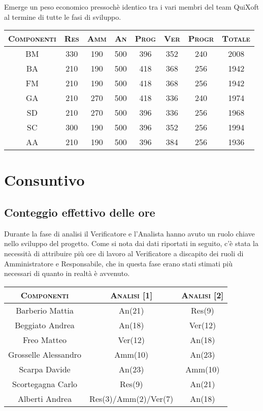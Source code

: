\documentclass[11pt,a4paper]{article}
\begin{document}
Emerge un peso economico pressochè identico tra i vari membri del team QuiXoft al termine di tutte le fasi di sviluppo.
\begin{center}
\begin{tabular}{|c||c|c|c|c|c|c||c|}
\hline
\textsc{Componenti} & \textsc{Res} & \textsc{Amm} & \textsc{An} & \textsc{Prog} & \textsc{Ver} & \textsc{Progr} & \textsc{Totale}\\
\hline \hline
BM & 330 & 190 & 500 & 396 & 352 & 240 & 2008 \\ \hline
BA & 210 & 190 & 500 & 418 & 368 & 256 & 1942 \\ \hline
FM & 210 & 190 & 500 & 418 & 368 & 256 & 1942 \\ \hline
GA & 210 & 270 & 500 & 418 & 336 & 240 & 1974 \\ \hline
SD & 210 & 270 & 500 & 396 & 336 & 256 & 1968 \\ \hline
SC & 300 & 190 & 500 & 396 & 352 & 256 & 1994 \\ \hline
AA & 210 & 190 & 500 & 396 & 384 & 256 & 1936 \\ \hline
\end{tabular}
\end{center}
\newpage

\section{Consuntivo}
\subsection{Conteggio effettivo delle ore}
Durante la fase di analisi il Verificatore e l'Analista hanno avuto un ruolo chiave nello sviluppo del progetto.
Come si nota dai dati riportati in seguito, c'è stata la necessità di attribuire più ore di lavoro al Verificatore a discapito dei ruoli di Amministratore e Responsabile, che in questa fase erano stati stimati più necessari di quanto in realtà è avvenuto.
\\
\begin{center}
\begin{tabular}{|c||c|c|}
\hline
\textsc{Componenti} & \textsc{Analisi [1]} & \textsc{Analisi [2]} \\ \hline \hline
Barberio Mattia & An(21) & Res(9) \\ \hline
Beggiato Andrea & An(18) & Ver(12) \\ \hline
Freo Matteo & Ver(12) & An(18) \\ \hline
Grosselle Alessandro & Amm(10) & An(23) \\ \hline
Scarpa Davide & An(23) & Amm(10) \\ \hline
Scortegagna Carlo & Res(9) & An(21) \\ \hline
Alberti Andrea & Res(3)/Amm(2)/Ver(7) & An(18) \\ \hline
\end{tabular}
\end{center}
\bigskip
\end{document}
